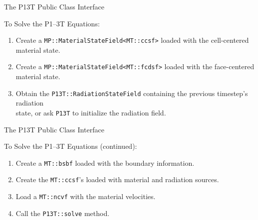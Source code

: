 \documentclass{myslidehead}
\begin{document}

\begin{slide}

  \begin{center}
    \large The P13T Public Class Interface
  \end{center}

  To Solve the P1--3T Equations:

  \begin{enumerate}
    \item Create a \verb#MP::MaterialStateField<MT::ccsf># loaded with
      the cell-centered material state.
    \item Create a \verb#MP::MaterialStateField<MT::fcdsf># loaded with
      the face-centered material state.
    \item Obtain the \verb#P13T::RadiationStateField#
      containing the previous timestep's radiation\\
      state, or ask \verb#P13T# to initialize
      the radiation field.
    \setcounter{myenumi}{\value{enumi}}
  \end{enumerate}

\end{slide}


\begin{slide}

  \begin{center}
    \large The P13T Public Class Interface
  \end{center}

  To Solve the P1--3T Equations (continued):

  \begin{enumerate}
    \setcounter{enumi}{\value{myenumi}}
    \item Create a \verb#MT::bsbf# loaded with the boundary information.
    \item Create the \verb#MT::ccsf#'s loaded with material and radiation
      sources.
    \item Load a \verb#MT::ncvf# with the material velocities.
    \normalcolor
    \item Call the \verb#P13T::solve# method.
    \setcounter{myenumi}{\value{enumi}}
  \end{enumerate}

\end{slide}
\end{document}
